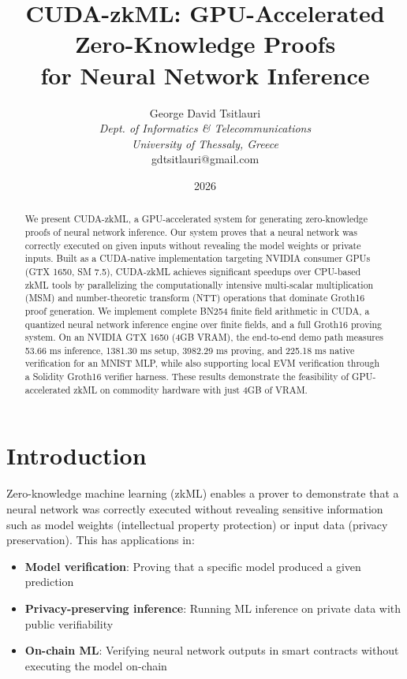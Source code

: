 \documentclass[11pt,a4paper]{article}
\title{\textbf{CUDA-zkML: GPU-Accelerated Zero-Knowledge Proofs\\
for Neural Network Inference}}
\author{George David Tsitlauri\\
\textit{Dept. of Informatics \& Telecommunications}\\
\textit{University of Thessaly, Greece}\\
gdtsitlauri@gmail.com}
\date{2026}
\begin{document}
\maketitle

\begin{abstract}
We present CUDA-zkML, a GPU-accelerated system for generating
zero-knowledge proofs of neural network inference. Our system proves
that a neural network was correctly executed on given inputs without
revealing the model weights or private inputs. Built as a CUDA-native
implementation targeting NVIDIA consumer GPUs (GTX 1650, SM 7.5),
CUDA-zkML achieves significant speedups over CPU-based zkML tools
by parallelizing the computationally intensive multi-scalar multiplication
(MSM) and number-theoretic transform (NTT) operations that dominate
Groth16 proof generation. We implement complete BN254 finite field
arithmetic in CUDA, a quantized neural network inference engine over
finite fields, and a full Groth16 proving system. On an NVIDIA GTX 1650
(4GB VRAM), the end-to-end demo path measures 53.66 ms inference,
1381.30 ms setup, 3982.29 ms proving, and 225.18 ms native verification
for an MNIST MLP, while also supporting local EVM verification through a
Solidity Groth16 verifier harness. These results demonstrate the
feasibility of GPU-accelerated zkML on commodity hardware with just 4GB
of VRAM.
\end{abstract}

\section{Introduction}

Zero-knowledge machine learning (zkML) enables a prover to demonstrate
that a neural network was correctly executed without revealing sensitive
information such as model weights (intellectual property protection)
or input data (privacy preservation). This has applications in:

\begin{itemize}
  \item \textbf{Model verification}: Proving that a specific model
    produced a given prediction
  \item \textbf{Privacy-preserving inference}: Running ML inference
    on private data with public verifiability
  \item \textbf{On-chain ML}: Verifying neural network outputs in
    smart contracts without executing the model on-chain
\end{itemize}
\end{document}
